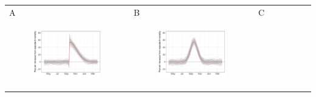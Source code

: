 \documentclass[11pt]{article}
\begin{document}
\begin{suppfigure}[ht]
	\begin{tabular}{lll}
	A&B&C\\
	\begin{subfigure}[t]{0.30\linewidth}
		\centering
		\includegraphics[width=1\linewidth]{figs/supp-figure-10a.pdf} 
	\end{subfigure}&
	\begin{subfigure}[t]{0.30\linewidth}
		\centering
		\includegraphics[width=1\linewidth]{figs/supp-figure-10b.pdf}
	\end{subfigure}&
	\begin{subfigure}[t]{0.30\linewidth}
		\centering

\end{subfigure}
\end{tabular}
\end{suppfigure}
\end{document}
